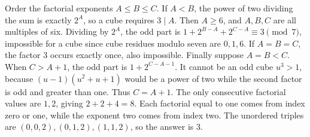 Order the factorial exponents $A\le B\le C$. If $A<B$, the power of two dividing the sum is exactly $2^A$, so a cube requires $3\mid A$. Then $A\ge6$, and $A,B,C$ are all multiples of six. Dividing by $2^A$, the odd part is $1+2^{B-A}+2^{C-A}\equiv3\pmod7$, impossible for a cube since cube residues modulo seven are $0,1,6$. If $A=B=C$, the factor $3$ occurs exactly once, also impossible. Finally suppose $A=B<C$. When $C>A+1$, the odd part is $1+2^{C-A-1}$. It cannot be an odd cube $u^3>1$, because $(u-1)(u^2+u+1)$ would be a power of two while the second factor is odd and greater than one. Thus $C=A+1$. The only consecutive factorial values are $1,2$, giving $2+2+4=8$. Each factorial equal to one comes from index zero or one, while the exponent two comes from index two. The unordered triples are $(0,0,2),(0,1,2),(1,1,2)$, so the answer is $\boxed3$.
